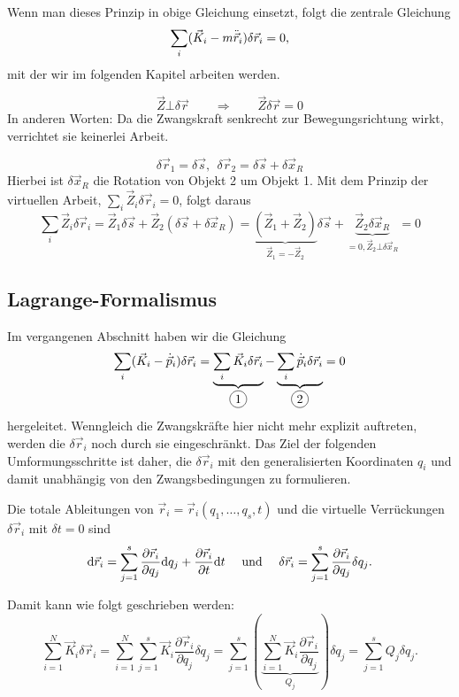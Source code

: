 Wenn man dieses Prinzip in obige Gleichung einsetzt, folgt die zentrale Gleichung
\[
	\sum_i (\vec{K}_i - m \ddot{\vec{r}}_i) \delta \vec{r}_i = 0
	\text{,}
\]
mit der wir im folgenden Kapitel arbeiten werden.

\begin{beispiel*}
$$\vec{Z} \bot \delta \vec{r} \qquad \Rightarrow \qquad \vec{Z} \delta \vec{r} = 0$$
In anderen Worten: Da die Zwangskraft senkrecht zur Bewegungsrichtung wirkt, verrichtet sie keinerlei Arbeit. 
\end{beispiel*}

\begin{beispiel*}[Hantel]
$$\delta \vec{r}_1 = \delta\vec{s},~~ \delta \vec{r}_2 = \delta \vec{s} + \delta \vec{x}_R$$
Hierbei ist $\delta \vec{x}_R$ die Rotation von Objekt 2 um Objekt 1.
Mit dem Prinzip der virtuellen Arbeit, $\sum_i \vec{Z}_i \delta \vec{r}_i = 0$, folgt daraus
$$\sum_i \vec Z_i \delta \vec{r}_i = \vec{Z}_1 \delta \vec{s} + \vec{Z}_2 (\delta \vec{s} + \delta \vec{x}_R) 
= \underbrace{(\vec{Z}_1 + \vec{Z}_2)}_{\vec{Z}_1 = - \vec{Z}_2} \delta \vec{s} + \underbrace{\vec{Z}_2 \delta \vec{x}_R}_{= 0, \vec{Z}_2 \bot \delta \vec{x}_R} = 0$$
\end{beispiel*}

\subsection{Lagrange-Formalismus}
Im vergangenen Abschnitt haben wir die Gleichung
\[
	\sum_i (\vec{K}_i - \dot{\vec{p}}_i) \delta \vec{r}_i 
	= \underbrace{\sum_i \vec{K}_i \delta\vec{r}_i}_{\circled{1}} 
	  - \underbrace{\sum_i \dot{\vec{p}}_i \delta\vec{r}_i}_{\circled{2}} 
	= 0
\]
hergeleitet. Wenngleich die Zwangskräfte hier nicht mehr explizit auftreten, werden die $\delta \vec{r}_i$ noch durch sie eingeschränkt. Das Ziel der folgenden Umformungsschritte ist daher, die $\delta \vec{r}_i$ mit den generalisierten Koordinaten $q_i$ und damit unabhängig von den Zwangsbedingungen zu formulieren. 

Die totale Ableitungen von $\vec{r}_i = \vec{r}_i(q_1, \dots, q_s, t)$ und die virtuelle Verrückungen $\delta \vec{r}_i$ mit $\delta t = 0$ sind
\[
	\mathrm d \vec{r}_i = \sum_{j = 1}^{s} \frac{\partial \vec{r}_i}{\partial q_j} \mathrm d q_j + \frac{\partial \vec{r}_i}{\partial t} \mathrm d t 
	\quad \text{ und } \quad
	\delta \vec{r}_i = \sum_{j = 1}^s \frac{\partial \vec{r}_i}{\partial q_j} \delta q_j
	\text{.}
\]

Damit kann   wie folgt geschrieben werden:
\[
	\sum_{i = 1}^N \vec{K}_i \delta \vec{r}_i 
	= \sum_{i=1}^N \sum_{j = 1}^s \vec{K}_i \frac{\partial \vec{r}_i}{\partial q_j} \delta q_j
	= \sum_{j=1}^s \left( \underbrace{\sum_{i = 1}^N \vec{K}_i \frac{\partial \vec{r}_i}{\partial q_j}}_{Q_j} \right) \delta q_j
	= \sum_{j = 1}^s Q_j \delta q_j
	\text{.}
\]

